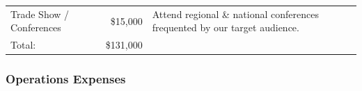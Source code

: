\documentclass[11pt,openany]{book}
\begin{document}
\begin{longtable}[]{@{}lrl@{}}
\begin{minipage}[t]{0.32\columnwidth}\raggedright
Trade Show / Conferences\strut
\end{minipage} & \begin{minipage}[t]{0.11\columnwidth}\raggedleft
\$15,000\strut
\end{minipage} & \begin{minipage}[t]{0.48\columnwidth}\raggedright
Attend regional \& national conferences frequented by our target
audience.\strut
\end{minipage}\tabularnewline
\begin{minipage}[t]{0.32\columnwidth}\raggedright
Total:\strut
\end{minipage} & \begin{minipage}[t]{0.11\columnwidth}\raggedleft
\$131,000\strut
\end{minipage} & \begin{minipage}[t]{0.48\columnwidth}\raggedright
\strut
\end{minipage}\tabularnewline
\bottomrule
\end{longtable}

\hypertarget{operations-expenses}{%
\subsubsection{Operations Expenses}\label{operations-expenses}}
\end{document}

